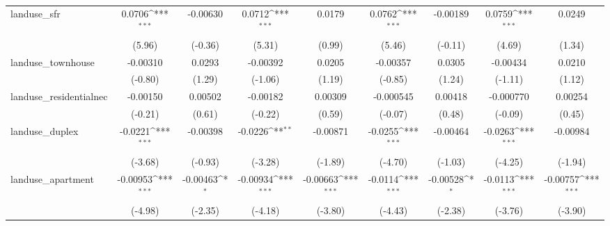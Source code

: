\begin{table}[htbp]\centering
\def\sym#1{\ifmmode^{#1}\else\(^{#1}\)\fi}
\caption{ \label{tab1}}
\begin{tabular}{l*{8}{c}}
\toprule
\midrule
landuse\_sfr         &      0.0706\sym{***}&    -0.00630         &      0.0712\sym{***}&      0.0179         &      0.0762\sym{***}&    -0.00189         &      0.0759\sym{***}&      0.0249         \\
                    &      (5.96)         &     (-0.36)         &      (5.31)         &      (0.99)         &      (5.46)         &     (-0.11)         &      (4.69)         &      (1.34)         \\
\addlinespace
landuse\_townhouse   &    -0.00310         &      0.0293         &    -0.00392         &      0.0205         &    -0.00357         &      0.0305         &    -0.00434         &      0.0210         \\
                    &     (-0.80)         &      (1.29)         &     (-1.06)         &      (1.19)         &     (-0.85)         &      (1.24)         &     (-1.11)         &      (1.12)         \\
\addlinespace
landuse\_residentialnec&    -0.00150         &     0.00502         &    -0.00182         &     0.00309         &   -0.000545         &     0.00418         &   -0.000770         &     0.00254         \\
                    &     (-0.21)         &      (0.61)         &     (-0.22)         &      (0.59)         &     (-0.07)         &      (0.48)         &     (-0.09)         &      (0.45)         \\
\addlinespace
landuse\_duplex      &     -0.0221\sym{***}&    -0.00398         &     -0.0226\sym{**} &    -0.00871         &     -0.0255\sym{***}&    -0.00464         &     -0.0263\sym{***}&    -0.00984         \\
                    &     (-3.68)         &     (-0.93)         &     (-3.28)         &     (-1.89)         &     (-4.70)         &     (-1.03)         &     (-4.25)         &     (-1.94)         \\
\addlinespace
landuse\_apartment   &    -0.00953\sym{***}&    -0.00463\sym{*}  &    -0.00934\sym{***}&    -0.00663\sym{***}&     -0.0114\sym{***}&    -0.00528\sym{*}  &     -0.0113\sym{***}&    -0.00757\sym{***}\\
                    &     (-4.98)         &     (-2.35)         &     (-4.18)         &     (-3.80)         &     (-4.43)         &     (-2.38)         &     (-3.76)         &     (-3.90)         \\

\end{tabular}
\end{table}
